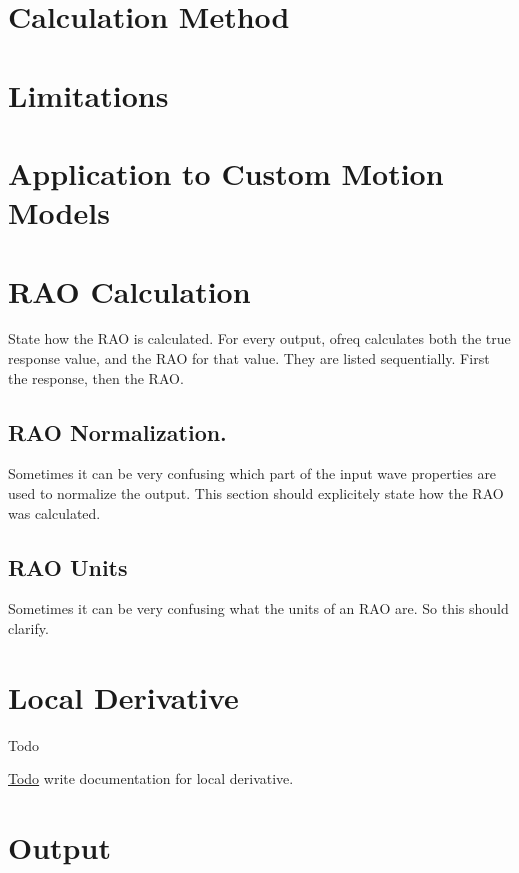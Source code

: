 \section*{Calculation Method}

\section*{Limitations}

\section*{Application to Custom Motion Models}

\section*{R\-A\-O Calculation}

State how the R\-A\-O is calculated. For every output, ofreq calculates both the true response value, and the R\-A\-O for that value. They are listed sequentially. First the response, then the R\-A\-O.

\subsection*{R\-A\-O Normalization.}

Sometimes it can be very confusing which part of the input wave properties are used to normalize the output. This section should explicitely state how the R\-A\-O was calculated.

\subsection*{R\-A\-O Units}

Sometimes it can be very confusing what the units of an R\-A\-O are. So this should clarify. \hypertarget{local_derivative}{}\section{Local Derivative}\label{local_derivative}
\begin{DoxyRefDesc}{Todo}
\item[\hyperlink{todo__todo000018}{Todo}]write documentation for local derivative.\end{DoxyRefDesc}


\section*{Output}

